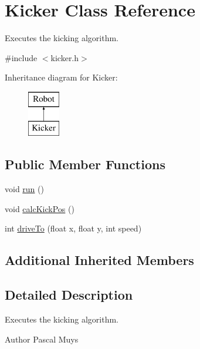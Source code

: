 \hypertarget{class_kicker}{\section{Kicker Class Reference}
\label{class_kicker}
}


Executes the kicking algorithm.  




{\ttfamily \#include $<$kicker.\-h$>$}

Inheritance diagram for Kicker\-:\begin{figure}[H]
\begin{center}
\leavevmode
\includegraphics[height=2.000000cm]{class_kicker}
\end{center}
\end{figure}
\subsection*{Public Member Functions}
\begin{DoxyCompactItemize}
\item 
void \hyperlink{class_kicker_a26691e52b8ad7e6e6651e9489f666a3c}{run} ()
\item 
void \hyperlink{class_kicker_a1b2741774273435fcb9c5d73d32f3072}{calc\-Kick\-Pos} ()
\item 
int \hyperlink{class_kicker_acacf48af361d85ec8f2aa1bb94aec726}{drive\-To} (float x, float y, int speed)
\end{DoxyCompactItemize}
\subsection*{Additional Inherited Members}


\subsection{Detailed Description}
Executes the kicking algorithm. 

\begin{DoxyAuthor}{Author}
Pascal Muys 
\end{DoxyAuthor}


